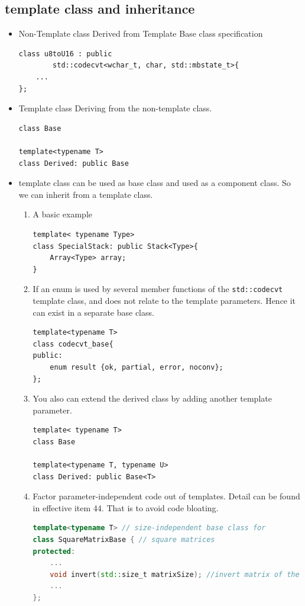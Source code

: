 \documentclass[a4paper,11pt,twoside]{book}
\begin{document}
\subsection{template class and inheritance}
\begin{itemize}

	\item Non-Template class Derived from Template Base class specification
\begin{lstlisting}[numbers=none]
class u8toU16 : public 
		std::codecvt<wchar_t, char, std::mbstate_t>{
	...
};
\end{lstlisting}

	\item Template class Deriving from the non-template class.
\begin{lstlisting}[numbers=none]
class Base
	
template<typename T>
class Derived: public Base
\end{lstlisting}	
	
	\item template class can be used as base class and used as a component class. So we can inherit from a template class.
    \begin{enumerate}
        \item A basic example
\begin{lstlisting}[numbers=none]
template< typename Type>
class SpecialStack: public Stack<Type>{
	Array<Type> array;
}
\end{lstlisting}	
	
        \item If an enum is used by several member functions of the \texttt{std::codecvt} template class, and does not relate to the template parameters. Hence it can exist in a separate base class.
	
\begin{lstlisting}[numbers=none]
template<typename T>
class codecvt_base{
public:
	enum result {ok, partial, error, noconv};
};
\end{lstlisting}
	
	\item You also can extend the derived class by adding another template parameter.
\begin{lstlisting}[numbers=none]
template< typename T>
class Base
	
template<typename T, typename U>
class Derived: public Base<T>
\end{lstlisting}
	
	
	\item Factor parameter-independent code out of templates. Detail can be found in effective item 44. That is to avoid code bloating.
\begin{lstlisting}[frame=single, language=c++]
template<typename T> // size-independent base class for
class SquareMatrixBase { // square matrices
protected:
	...
	void invert(std::size_t matrixSize); //invert matrix of the given size.
	...
};
	

\end{lstlisting}
\end{enumerate}
\end{itemize}
\end{document}
